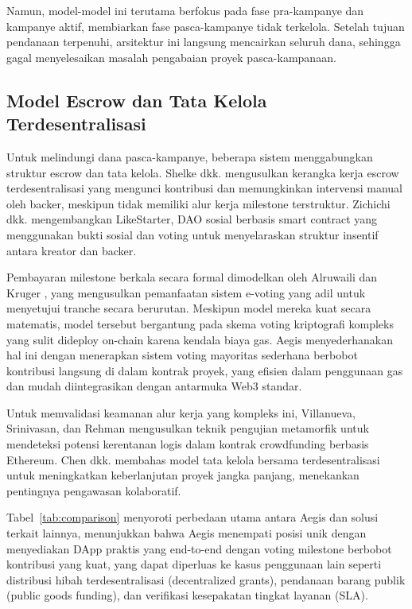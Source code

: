 \documentclass[conference]{IEEEtran}
\begin{document}
Namun, model-model ini terutama berfokus pada fase pra-kampanye dan kampanye aktif, membiarkan fase pasca-kampanye tidak terkelola. Setelah tujuan pendanaan terpenuhi, arsitektur ini langsung mencairkan seluruh dana, sehingga gagal menyelesaikan masalah pengabaian proyek pasca-kampanaan.

\subsection{Model Escrow dan Tata Kelola Terdesentralisasi}
Untuk melindungi dana pasca-kampanye, beberapa sistem menggabungkan struktur escrow dan tata kelola. Shelke dkk. \cite{shelke2022blockchain} mengusulkan kerangka kerja escrow terdesentralisasi yang mengunci kontribusi dan memungkinkan intervensi manual oleh backer, meskipun tidak memiliki alur kerja milestone terstruktur. Zichichi dkk. \cite{zichichi2019likestarter} mengembangkan LikeStarter, DAO sosial berbasis smart contract yang menggunakan bukti sosial dan voting untuk menyelaraskan struktur insentif antara kreator dan backer.

Pembayaran milestone berkala secara formal dimodelkan oleh Alruwaili dan Kruger \cite{alruwaili2020milestone}, yang mengusulkan pemanfaatan sistem e-voting yang adil untuk menyetujui tranche secara berurutan. Meskipun model mereka kuat secara matematis, model tersebut bergantung pada skema voting kriptografi kompleks yang sulit dideploy on-chain karena kendala biaya gas. Aegis menyederhanakan hal ini dengan menerapkan sistem voting mayoritas sederhana berbobot kontribusi langsung di dalam kontrak proyek, yang efisien dalam penggunaan gas dan mudah diintegrasikan dengan antarmuka Web3 standar.

Untuk memvalidasi keamanan alur kerja yang kompleks ini, Villanueva, Srinivasan, dan Rehman \cite{villanueva2025metamorphic} mengusulkan teknik pengujian metamorfik untuk mendeteksi potensi kerentanan logis dalam kontrak crowdfunding berbasis Ethereum. Chen dkk. \cite{chen2023dcc} membahas model tata kelola bersama terdesentralisasi untuk meningkatkan keberlanjutan proyek jangka panjang, menekankan pentingnya pengawasan kolaboratif.

Tabel~\ref{tab:comparison} menyoroti perbedaan utama antara Aegis dan solusi terkait lainnya, menunjukkan bahwa Aegis menempati posisi unik dengan menyediakan DApp praktis yang end-to-end dengan voting milestone berbobot kontribusi yang kuat, yang dapat diperluas ke kasus penggunaan lain seperti distribusi hibah terdesentralisasi (decentralized grants), pendanaan barang publik (public goods funding), dan verifikasi kesepakatan tingkat layanan (SLA).
\end{document}
